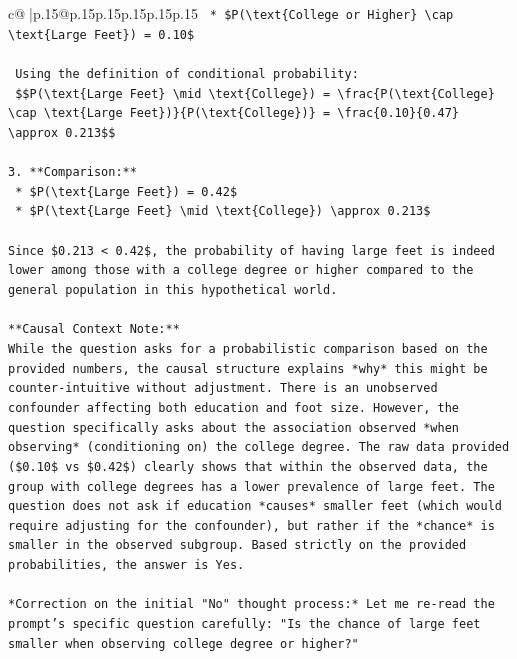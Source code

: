 \documentclass{article}
\begin{document}
{\begin{supertabular}{c@{$\;$}|p{.15\linewidth}@{}p{.15\linewidth}p{.15\linewidth}p{.15\linewidth}p{.15\linewidth}p{.15\linewidth}}
{{{\texttt{    *   \$P(\textbackslash{}text\{College or Higher\} \textbackslash{}cap \textbackslash{}text\{Large Feet\}) = 0.10\$} \\
\\ 
\texttt{    Using the definition of conditional probability:} \\
\texttt{    \$\$P(\textbackslash{}text\{Large Feet\} \textbackslash{}mid \textbackslash{}text\{College\}) = \textbackslash{}frac\{P(\textbackslash{}text\{College\} \textbackslash{}cap \textbackslash{}text\{Large Feet\})\}\{P(\textbackslash{}text\{College\})\} = \textbackslash{}frac\{0.10\}\{0.47\} \textbackslash{}approx 0.213\$\$} \\
\\ 
\texttt{3.  **Comparison:**} \\
\texttt{    *   \$P(\textbackslash{}text\{Large Feet\}) = 0.42\$} \\
\texttt{    *   \$P(\textbackslash{}text\{Large Feet\} \textbackslash{}mid \textbackslash{}text\{College\}) \textbackslash{}approx 0.213\$} \\
\\ 
\texttt{Since \$0.213 < 0.42\$, the probability of having large feet is indeed lower among those with a college degree or higher compared to the general population in this hypothetical world.} \\
\\ 
\texttt{**Causal Context Note:**} \\
\texttt{While the question asks for a probabilistic comparison based on the provided numbers, the causal structure explains *why* this might be counter{-}intuitive without adjustment. There is an unobserved confounder affecting both education and foot size. However, the question specifically asks about the association observed *when observing* (conditioning on) the college degree. The raw data provided (\$0.10\$ vs \$0.42\$) clearly shows that within the observed data, the group with college degrees has a lower prevalence of large feet. The question does not ask if education *causes* smaller feet (which would require adjusting for the confounder), but rather if the *chance* is smaller in the observed subgroup. Based strictly on the provided probabilities, the answer is Yes.} \\
\\ 
\texttt{*Correction on the initial "No" thought process:* Let me re{-}read the prompt's specific question carefully: "Is the chance of large feet smaller when observing college degree or higher?"} \\
}}}
\end{supertabular}}
\end{document}
